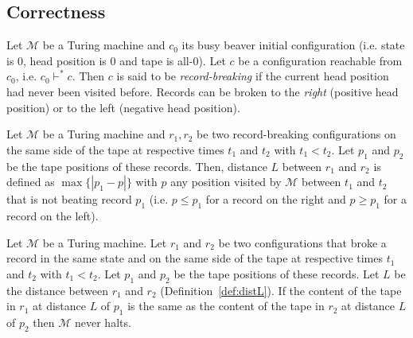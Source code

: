 \subsection{Correctness}

\begin{definition}
  Let $\mathcal{M}$ be a Turing machine and $c_0$ its busy beaver initial configuration (i.e. state is 0, head position is 0 and tape is all-0).
  Let $c$ be a configuration reachable from $c_0$, i.e. $c_0 \vdash^* c$.
  Then $c$ is said to be \textit{record-breaking} if the current head position had never been visited before. Records can be broken to the \textit{right} (positive head position) or to the left (negative head position).
\end{definition}

\begin{definition}\label{def:distL}
  Let $\mathcal{M}$ be a Turing machine and $r_1,r_2$ be two record-breaking configurations on the same side of the tape at respective times $t_1$ and $t_2$ with $t_1 < t_2$. Let $p_1$ and $p_2$ be the tape positions of these records. Then, distance $L$ between $r_1$ and $r_2$ is defined as $\max\{|p_1 - p|\}$ with $p$ any position visited by $\mathcal{M}$ between $t_1$ and $t_2$ that is not beating record $p_1$ (i.e. $p \leq p_1$ for a record on the right and $p \geq p_1$ for a record on the left).
\end{definition}

\begin{lemma}\label{lem:translated-cyclers}
  Let $\mathcal{M}$ be a Turing machine. Let $r_1$ and $r_2$ be two configurations that broke a record in the same state and on the same side of the tape at respective times $t_1$ and $t_2$ with $t_1 < t_2$. Let $p_1$ and $p_2$ be the tape positions of these records. Let $L$ be the distance between $r_1$ and $r_2$ (Definition~\ref{def:distL}). If the content of the tape in $r_1$ at distance $L$ of $p_1$ is the same as the content of the tape in $r_2$ at distance $L$ of $p_2$ then $\mathcal{M}$ never halts.
\end{lemma}

